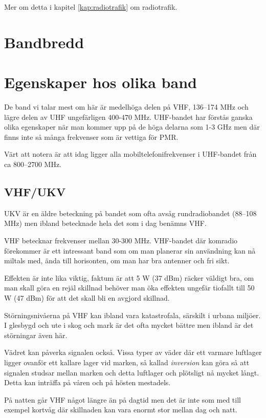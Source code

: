 Mer om detta i kapitel  \ref{kap:radiotrafik} om radiotrafik.

\section{Bandbredd}


\section{Egenskaper hos olika band}

De band vi talar mest om här är medelhöga delen på VHF, 136--174 MHz och lägre delen av UHF ungefärligen 400-470 MHz. UHF-bandet har förstås ganska olika egenskaper när man kommer upp på de höga delarna som 1-3 GHz men där finns inte så många frekvenser som är vettiga för PMR.

Värt att notera är att idag ligger alla mobiltelefonifrekvenser i UHF-bandet från ca 800--2700 MHz.

\subsection{VHF/UKV}

UKV är en äldre beteckning på bandet som ofta avsåg rundradiobandet (88--108 MHz) men ibland betecknade hela det som i dag benämns VHF.

VHF betecknar frekvenser mellan 30-300 MHz. VHF-bandet där komradio förekommer är ett intressant band som om man planerar sin användning kan nå miltals med, ända till horisonten, om man har bra antenner och fri sikt. 

Effekten är inte lika viktig, faktum är att 5 W (37 dBm) räcker väldigt bra, om man skall göra en rejäl skillnad behöver man öka effekten ungefär tiofallt till 50 W (47 dBm) för att det skall bli en avgjord skillnad. 

Störningsnivåerna på VHF kan ibland vara katastrofala, särskilt i urbana miljöer. I glesbygd och ute i skog och mark är det ofta mycket bättre men ibland är det störningar även här. 

Vädret kan påverka signalen också. Vissa typer av väder där ett varmare luftlager ligger ovanför ett kallare lager vid marken, så kallad \textit{inversion} kan göra så att signalen studsar mellan marken och detta luftlager och plötsligt nå mycket långt. Detta kan inträffa på våren och på hösten mestadels.

På natten går VHF något längre än på dagtid men det är inte som med till exempel kortvåg där skillnaden kan vara enormt stor mellan dag och natt.

